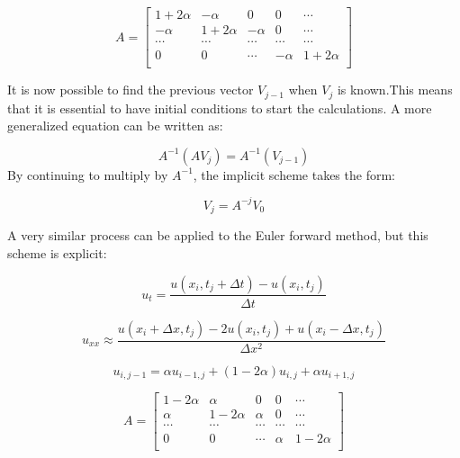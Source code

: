 \documentclass[10pt,a4paper]{article}
\begin{document}
\begin{equation}
A = \begin{bmatrix}
1 + 2\alpha & -\alpha & 0 & 0 &\cdots\\
-\alpha & 1 + 2\alpha & -\alpha & 0 & \cdots\\
\cdots & \cdots & \cdots & \cdots & \cdots\\
0 & 0 & \cdots & -\alpha & 1 + 2\alpha\\

\end{bmatrix}
\end{equation}

\noindent It is now possible to find the previous vector $V_{j-1}$ when $V_j$ is known.This means that it is essential to have initial conditions to start the calculations. A more generalized equation can be written as:

\begin{equation}
A^{-1}(AV_j) = A^{-1}(V_{j-1})
\end{equation}
\noindent By continuing to multiply by $A^{-1}$, the implicit scheme takes the form:

\begin{equation}
V_j = A^{-j}V_0
\end{equation}

\noindent A very similar process can be applied to the Euler forward method, but this scheme is explicit:

\begin{equation}
u_t = \frac{u(x_i,t_j + \Delta t) - u(x_i,t_j)}{\Delta t}
\end{equation}

\begin{equation}
u_{xx} \approx \frac{u(x_i + \Delta x,t_j) - 2u(x_i,t_j) + u(x_i - \Delta x,t_j)}{\Delta x^2} 
\end{equation}

\begin{equation}
u_{i,j-1} = \alpha u_{i-1,j} + (1 - 2\alpha)u_{i,j} + \alpha u_{i+1,j}
\end{equation}

\begin{equation}
A = \begin{bmatrix}
1 - 2\alpha & \alpha & 0 & 0 &\cdots\\
\alpha & 1 - 2\alpha & \alpha & 0 & \cdots\\
\cdots & \cdots & \cdots & \cdots & \cdots\\
0 & 0 & \cdots & \alpha & 1 - 2\alpha\\

\end{bmatrix}
\end{equation}
\end{document}
